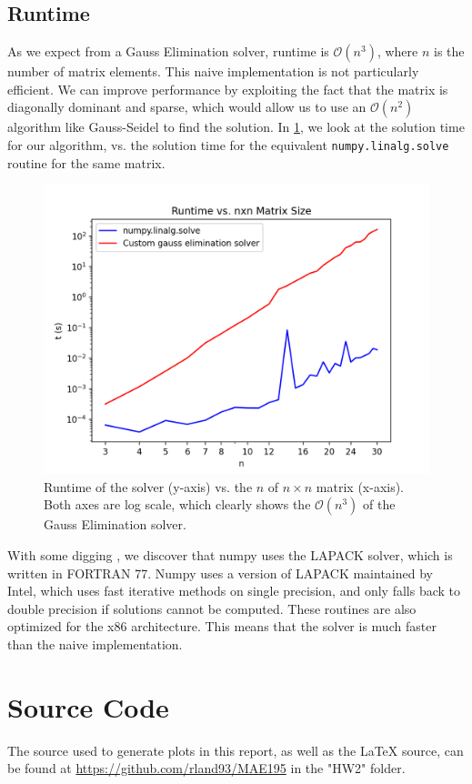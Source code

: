 \documentclass[10pt,letterpaper,notitlepage]{article}
\begin{document}
	\subsection{Runtime}
	As we expect from a Gauss Elimination solver, runtime is $\mathcal{O}(n^3)$, where $n$ is the number of matrix elements. This naive implementation is not particularly efficient. We can improve performance by exploiting the fact that the matrix is diagonally dominant and sparse, which would allow us to use an $\mathcal{O}(n^2)$ algorithm like Gauss-Seidel to find the solution.
	In \cref{fig:complexity}, we look at the solution time for our algorithm, vs. the solution time for the equivalent \texttt{numpy.linalg.solve} routine for the same matrix.
	\begin{figure}
		\includegraphics[width=0.9\linewidth]{runtime_vs_n.png}
		\caption[Runtime vs. Matrix Size]{Runtime of the solver (y-axis) vs. the $n$ of $n\times n$ matrix (x-axis). Both axes are log scale, which clearly shows the $\mathcal{O}(n^3)$ of the Gauss Elimination solver.}
		\label{fig:complexity}
	\end{figure}
	With some digging \cite{ali_mAnswerWhyDoes2015}, we discover that numpy uses the LAPACK solver, which is written in FORTRAN 77. Numpy uses a version of LAPACK maintained by Intel, which uses fast iterative methods on single precision, and only falls back to double precision if solutions cannot be computed. These routines are also optimized for the x86 architecture. This means that the solver is much faster than the naive implementation. \cite{Gesv}
	\section{Source Code}
	The source used to generate plots in this report, as well as the LaTeX source, can be found at \url{https://github.com/rland93/MAE195} in the "HW2" folder.
	\printbibliography
\end{document}
